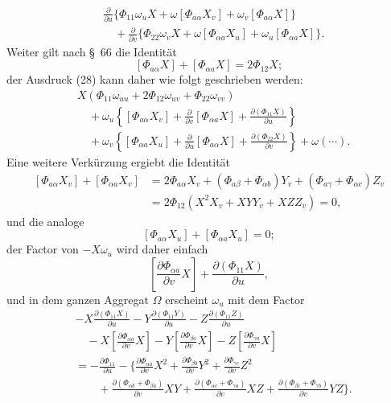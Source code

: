 \documentclass[11pt,a4paper,leqno]{article}
\begin{document}
\begin{equation}\tag{28}
\begin{aligned}
&\frac{\partial}{\partial u}\{\Phi_{11}\omega_uX
+\omega[\Phi_{a\alpha}X_v]+\omega_v[\Phi_{a\alpha}X]\}\\
&\quad+\frac{\partial}{\partial v}\{\Phi_{22}\omega_vX
+\omega[\Phi_{\alpha a}X_u]+\omega_u[\Phi_{\alpha a}X]\}.
\end{aligned}
\end{equation}
Weiter gilt nach \S~66 die Identität
\[
[\Phi_{a\alpha}X]+[\Phi_{\alpha a}X]=2\Phi_{12}X;
\]
der Ausdruck (28) kann daher wie folgt geschrieben werden:
\[
\begin{aligned}
&X(\Phi_{11}\omega_{uu}+2\Phi_{12}\omega_{uv}
+\Phi_{22}\omega_{vv})\\
&\quad+\omega_u\left\{[\Phi_{a\alpha}X_v]
+\frac{\partial}{\partial v}[\Phi_{\alpha a}X]
+\frac{\partial(\Phi_{11}X)}{\partial u}\right\}\\
&\quad+\omega_v\left\{[\Phi_{\alpha a}X_u]
+\frac{\partial}{\partial u}[\Phi_{a\alpha}X]
+\frac{\partial(\Phi_{22}X)}{\partial v}\right\}
+\omega(\cdots).
\end{aligned}
\]
Eine weitere Verkürzung ergiebt die Identität
\[
\begin{aligned}
[\Phi_{a\alpha}X_v]+[\Phi_{\alpha a}X_v]
&=2\Phi_{a\alpha}X_v+(\Phi_{a\beta}+\Phi_{\alpha b})Y_v
+(\Phi_{a\gamma}+\Phi_{\alpha c})Z_v\\
&=2\Phi_{12}(X^2X_v+XYY_v+XZZ_v)=0,
\end{aligned}
\]
und die analoge
\[
[\Phi_{a\alpha}X_u]+[\Phi_{\alpha a}X_u]=0;
\]
der Factor von $-X\omega_u$ wird daher einfach
\[
\left[\frac{\partial\Phi_{\alpha a}}{\partial v}X\right]
+\frac{\partial(\Phi_{11}X)}{\partial u},
\]
und in dem ganzen Aggregat $\Omega$ erscheint $\omega_u$ mit dem Factor
\[
\begin{aligned}
&-X\frac{\partial(\Phi_{11}X)}{\partial u}
-Y\frac{\partial(\Phi_{11}Y)}{\partial u}
-Z\frac{\partial(\Phi_{11}Z)}{\partial u}\\
&\quad-X\left[\frac{\partial\Phi_{\alpha a}}{\partial v}X\right]
-Y\left[\frac{\partial\Phi_{\beta a}}{\partial v}X\right]
-Z\left[\frac{\partial\Phi_{\gamma a}}{\partial v}X\right]\\
&=-\frac{\partial\Phi_{11}}{\partial u}
-\Biggl\{\frac{\partial\Phi_{\alpha a}}{\partial v}X^2
+\frac{\partial\Phi_{\beta b}}{\partial v}Y^2
+\frac{\partial\Phi_{\gamma c}}{\partial v}Z^2\\
&\qquad+\frac{\partial(\Phi_{\alpha b}+\Phi_{\beta a})}{\partial v}XY
+\frac{\partial(\Phi_{\alpha c}+\Phi_{\gamma a})}{\partial v}XZ
+\frac{\partial(\Phi_{\beta c}+\Phi_{\gamma b})}{\partial v}YZ\Biggr\}.
\end{aligned}
\]
\end{document}
